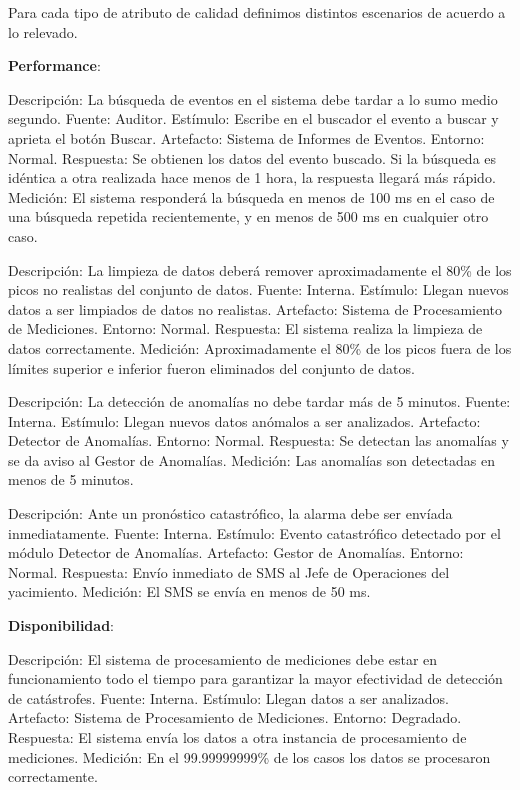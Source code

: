 \documentclass{article}
\theoremstyle{definition}
\theoremstyle{remark}
\begin{document}
Para cada tipo de atributo de calidad definimos distintos escenarios de acuerdo a lo relevado.

\textbf{Performance}:

Descripción: La búsqueda de eventos en el sistema debe tardar a lo sumo medio segundo.
Fuente: Auditor.
Estímulo: Escribe en el buscador el evento a buscar y aprieta el botón Buscar.
Artefacto: Sistema de Informes de Eventos.
Entorno: Normal.
Respuesta: Se obtienen los datos del evento buscado. Si la búsqueda es idéntica a otra realizada hace menos de 1 hora, la respuesta llegará más rápido.
Medición: El sistema responderá la búsqueda en menos de 100 ms en el caso de una búsqueda repetida recientemente, y en menos de 500 ms en cualquier otro caso.

Descripción: La limpieza de datos deberá remover aproximadamente el 80\% de los picos no realistas del conjunto de datos.
Fuente: Interna. %
Estímulo: Llegan nuevos datos a ser limpiados de datos no realistas. %
Artefacto: Sistema de Procesamiento de Mediciones. %
Entorno: Normal.
Respuesta: El sistema realiza la limpieza de datos correctamente.
Medición: Aproximadamente el 80\% de los picos fuera de los límites superior e inferior fueron eliminados del conjunto de datos.

Descripción: La detección de anomalías no debe tardar más de 5 minutos.
Fuente: Interna.
Estímulo: Llegan nuevos datos anómalos a ser analizados.
Artefacto: Detector de Anomalías.
Entorno: Normal.
Respuesta: Se detectan las anomalías y se da aviso al Gestor de Anomalías.
Medición: Las anomalías son detectadas en menos de 5 minutos.

Descripción: Ante un pronóstico catastrófico, la alarma debe ser envíada inmediatamente.
Fuente: Interna.
Estímulo: Evento catastrófico detectado por el módulo Detector de Anomalías.
Artefacto: Gestor de Anomalías.
Entorno: Normal.
Respuesta: Envío inmediato de SMS al Jefe de Operaciones del yacimiento.
Medición: El SMS se envía en menos de 50 ms.

\textbf{Disponibilidad}:

Descripción: El sistema de procesamiento de mediciones debe estar en funcionamiento todo el tiempo para garantizar la mayor efectividad de detección de catástrofes.
Fuente: Interna.
Estímulo: Llegan datos a ser analizados.
Artefacto: Sistema de Procesamiento de Mediciones.
Entorno: Degradado.
Respuesta: El sistema envía los datos a otra instancia de procesamiento de mediciones.
Medición: En el 99.99999999\% de los casos los datos se procesaron correctamente.
\end{document}

